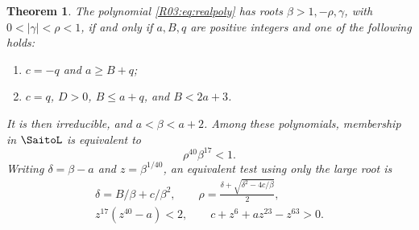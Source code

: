 \documentclass[11pt,a4paper]{article}
\newtheorem{theorem}{Theorem}[section]
\theoremstyle{definition}\newtheorem{definition}[theorem]{Definition}
\theoremstyle{remark}\newtheorem{remark}[theorem]{Remark}
\begin{document}
\begin{theorem}\label{R03:thm:locus}
The polynomial \eqref{R03:eq:realpoly} has roots
$\beta>1,-\rho,\gamma$, with $0<|\gamma|<\rho<1$, if and only if
$a,B,q$ are positive integers and one of the following holds:
\begin{enumerate}[label=(\roman*)]
\item $c=-q$ and $a\ge B+q$;
\item $c=q$, $D>0$, $B\le a+q$, and $B<2a+3$.
\end{enumerate}
It is then irreducible, and $a<\beta<a+2$.
Among these polynomials, membership in $\SaitoL$ is equivalent to
\begin{equation}\label{R03:eq:strict-shrink}
 \rho^{40}\beta^{17}<1.
\end{equation}
Writing $\delta=\beta-a$ and $z=\beta^{1/40}$, an equivalent test
using only the large root is
\begin{equation}\label{R03:eq:large-root-test}
 \begin{gathered}
 \delta=B/\beta+c/\beta^2,\qquad
 \rho=\frac{\delta+\sqrt{\delta^2-4c/\beta}}2,\\
 z^{17}(z^{40}-a)<2,\qquad
 c+z^6+az^{23}-z^{63}>0.
 \end{gathered}
\end{equation}
\end{theorem}
\end{document}
